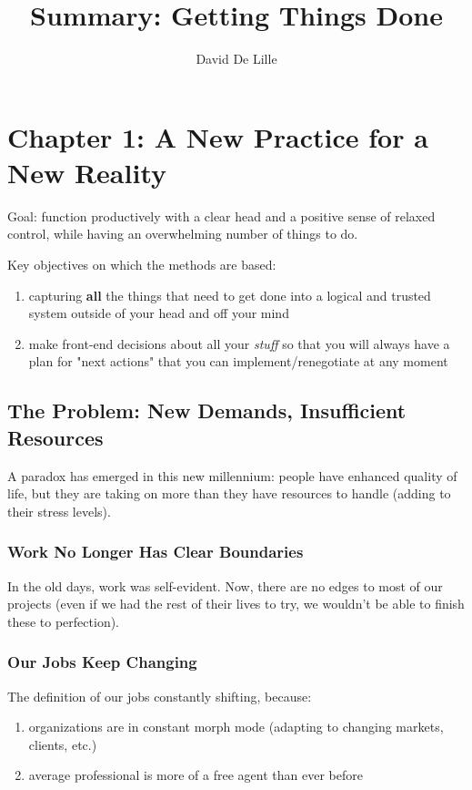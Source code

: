 \documentclass[letterpaper]{article}
\author{David De Lille}
\title{Summary: Getting Things Done}
\newcommand{\p}{\vspace{1em}\par}		%
\begin{document}
\maketitle

\section{Chapter 1: A New Practice for a New Reality}
Goal: function productively with a clear head and a
positive sense of relaxed control, while having an overwhelming number of
things to do.

\p Key objectives on which the methods are based:
\begin{enumerate}
\item capturing \textbf{all} the things that need to get done into a logical and trusted system outside of your head and off your mind
\item make front-end decisions about all your \textit{stuff} so that you will always have a plan for "next actions" that you can implement/renegotiate at any moment
\end{enumerate}

\subsection{The Problem: New Demands, Insufficient Resources}
A paradox has emerged in this new millennium: people have enhanced quality of life, but they are taking on more than they have resources to handle (adding to their stress levels).

\subsubsection*{Work No Longer Has Clear Boundaries}
In the old days, work was self-evident. Now, there are no edges to most of our projects (even if we had the rest of their lives to try, we wouldn't be able to finish these to perfection). 

\subsubsection*{Our Jobs Keep Changing}
The definition of our jobs constantly shifting, because:
\begin{enumerate}
\item organizations are in constant morph mode (adapting to changing markets, clients, etc.)
\item average professional is more of a free agent than ever before
\end{enumerate}
\end{document}
